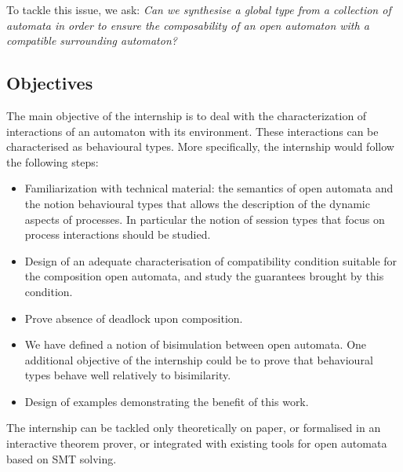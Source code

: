 \documentclass[11pt,fleqn]{article}
\begin{document}
 
To tackle this issue, we ask: { \it Can we synthesise a global type from a collection of automata in order to ensure the composability of an open automaton  with a compatible  surrounding automaton? }



\subsection*{Objectives}

The main objective of the internship is to deal with the characterization of interactions  of an automaton with its environment. These interactions can be characterised as behavioural types.
More specifically, the internship would follow the following steps:
\begin{itemize}
\item Familiarization with technical material: the semantics of  open automata and the notion behavioural types \cite{Hans:2016} that allows the description of the dynamic aspects of processes. In particular the notion of session types that focus on process interactions should be studied.

\item Design of an adequate characterisation of  compatibility condition  suitable for the composition open automata, and study the guarantees brought by this condition. 

\item Prove absence of deadlock upon composition.

\item  We  have defined a notion of bisimulation between open automata. 
One additional objective of the internship could be to prove that behavioural types behave well relatively to bisimilarity.

\item Design of examples demonstrating the benefit of this work.

\end{itemize}

The internship can be tackled only theoretically on paper, or formalised in an interactive theorem prover, or integrated with existing tools for open automata based on SMT solving.
 
\end{document}
